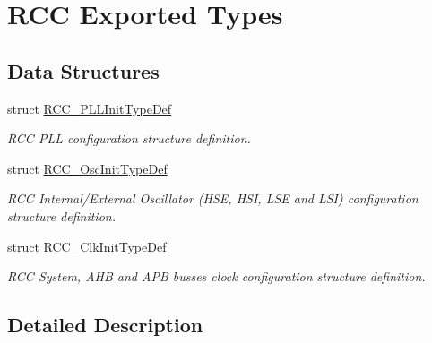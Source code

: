 \hypertarget{group___r_c_c___exported___types}{}\section{R\+CC Exported Types}
\label{group___r_c_c___exported___types}
\subsection*{Data Structures}
\begin{DoxyCompactItemize}
\item 
struct \hyperlink{struct_r_c_c___p_l_l_init_type_def}{R\+C\+C\+\_\+\+P\+L\+L\+Init\+Type\+Def}
\begin{DoxyCompactList}\small\item\em R\+CC P\+LL configuration structure definition. \end{DoxyCompactList}\item 
struct \hyperlink{struct_r_c_c___osc_init_type_def}{R\+C\+C\+\_\+\+Osc\+Init\+Type\+Def}
\begin{DoxyCompactList}\small\item\em R\+CC Internal/\+External Oscillator (H\+SE, H\+SI, L\+SE and L\+SI) configuration structure definition. \end{DoxyCompactList}\item 
struct \hyperlink{struct_r_c_c___clk_init_type_def}{R\+C\+C\+\_\+\+Clk\+Init\+Type\+Def}
\begin{DoxyCompactList}\small\item\em R\+CC System, A\+HB and A\+PB busses clock configuration structure definition. \end{DoxyCompactList}\end{DoxyCompactItemize}


\subsection{Detailed Description}
